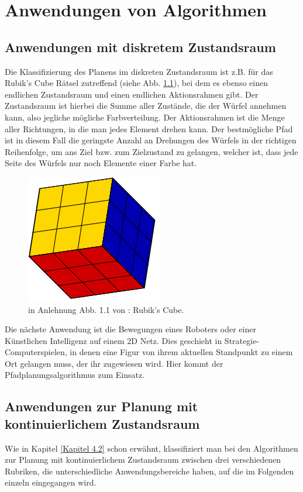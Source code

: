 \chapter{Anwendungen von Algorithmen}
\section{Anwendungen mit diskretem Zustandsraum}
Die Klassifizierung des Planens im  diskreten Zustandsraum ist z.B. für das Rubik's Cube Rätsel zutreffend (siehe Abb. \ref{Abb. 5.1}), bei dem es ebenso einen endlichen Zustandsraum und einen endlichen Aktionsrahmen gibt. Der Zustandsraum ist hierbei die Summe aller Zustände, die der Würfel annehmen kann, also jegliche mögliche Farbverteilung. Der Aktionsrahmen ist die Menge aller Richtungen, in die man jedes Element drehen kann. Der bestmögliche Pfad ist in diesem Fall die geringste Anzahl an Drehungen des Würfels in der richtigen Reihenfolge, um ans Ziel bzw. zum Zielzustand zu gelangen, welcher ist, dass jede Seite des Würfels nur noch Elemente einer Farbe hat.\cite[~S. 20]{Lav06}\\
\begin{figure}
	\centering
	\includegraphics[width=0.4\linewidth]{images/img229}
	\caption{in Anlehnung Abb. 1.1 von \cite[~S. 5]{Lav06}: Rubik's Cube.}
	\label{Abb. 5.1}
\end{figure}

Die nächste Anwendung ist die Bewegungen eines Roboters oder einer Künstlichen Intelligenz auf einem 2D Netz. Dies geschieht in Strategie-Computerspielen, in denen eine Figur von ihrem aktuellen Standpunkt zu einem Ort gelangen muss, der ihr zugewiesen wird. Hier kommt der Pfadplanungsalgorithmus zum Einsatz.\cite{cui2011based}%
\section{Anwendungen zur Planung mit kontinuierlichem Zustandsraum}
Wie in Kapitel \ref{Kapitel 4.2} schon erwähnt, klassifiziert man bei den Algorithmen zur Planung mit kontinuierlichem Zustandsraum zwischen drei verschiedenen Rubriken, die unterschiedliche Anwendungsbereiche haben, auf die im Folgenden einzeln eingegangen wird.
